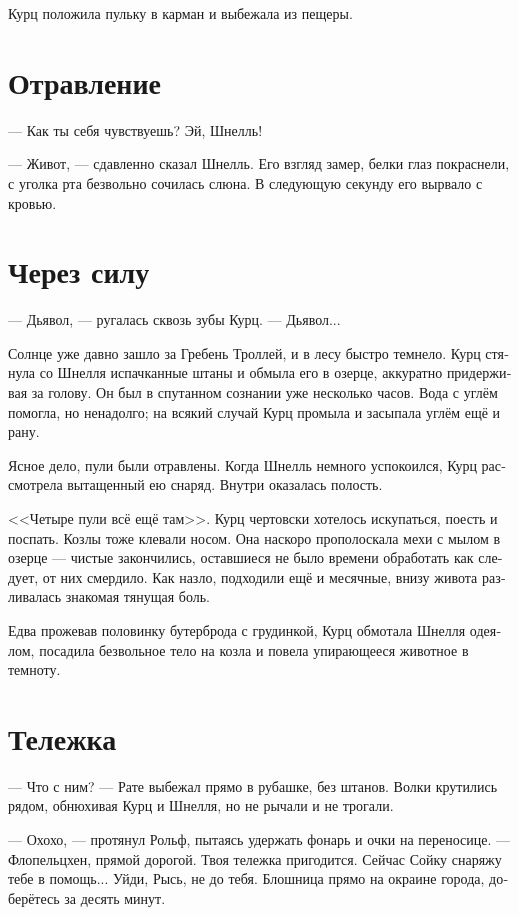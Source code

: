 \documentclass[a4paper,12pt,fleqn]{book}\usepackage{polyglossia}\setdefaultlanguage[babelshorthands=true]{russian}\setotherlanguage{english}\defaultfontfeatures{Ligatures=TeX,Mapping=tex-text}\usepackage{xcolor}\newcommand{\ml}[3]{#2}
\begin{document}
Курц положила пульку в карман и выбежала из пещеры.

\section{Отравление}

--- Как ты себя чувствуешь?
Эй, Шнелль!

--- Живот, --- сдавленно сказал Шнелль.
Его взгляд замер, белки глаз покраснели, с уголка рта безвольно сочилась слюна.
В следующую секунду его вырвало с кровью.

\section{Через силу}

--- Дьявол, --- ругалась сквозь зубы Курц.
--- Дьявол...

Солнце уже давно зашло за Гребень Троллей, и в лесу быстро темнело.
Курц стянула со Шнелля испачканные штаны и обмыла его в озерце, аккуратно придерживая за голову.
Он был в спутанном сознании уже несколько часов.
Вода с углём помогла, но ненадолго;
на всякий случай Курц промыла и засыпала углём ещё и рану.

Ясное дело, пули были отравлены.
Когда Шнелль немного успокоился, Курц рассмотрела вытащенный ею снаряд.
Внутри оказалась полость.

<<Четыре пули всё ещё там>>.
Курц чертовски хотелось искупаться, поесть и поспать.
Козлы тоже клевали носом.
Она наскоро прополоскала мехи с мылом в озерце --- чистые закончились, оставшиеся не было времени обработать как следует, от них смердило.
Как назло, подходили ещё и месячные, внизу живота разливалась знакомая тянущая боль.

Едва прожевав половинку бутерброда с грудинкой, Курц обмотала Шнелля одеялом, посадила безвольное тело на козла и повела упирающееся животное в темноту.

\section{Тележка}

--- Что с ним? --- Рате выбежал прямо в рубашке, без штанов.
Волки крутились рядом, обнюхивая Курц и Шнелля, но не рычали и не трогали.

--- Охохо, --- протянул Рольф, пытаясь удержать фонарь и очки на переносице.
\ml{$0$}
{--- Флопельцхен, прямой дорогой.}
{``Flohpelzchen, right that way.}
Твоя тележка пригодится.
Сейчас Сойку снаряжу тебе в помощь...
Уйди, Рысь, не до тебя.
Блошница прямо на окраине города, доберётесь за десять минут.
\end{document}
